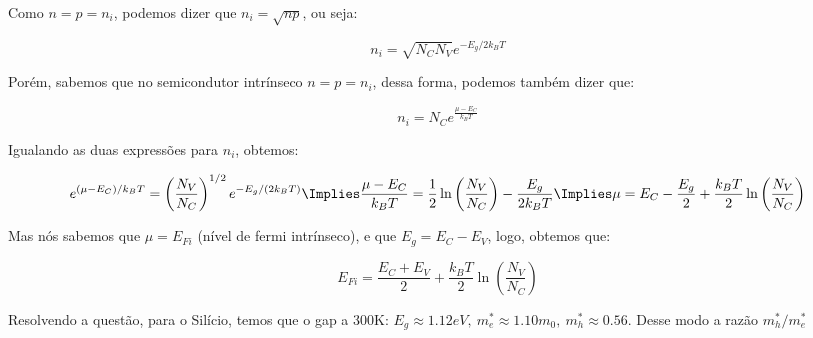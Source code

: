 \begin{enumerate}
Como $n = p = n_i$, podemos dizer que $n_i = \sqrt{np}$, ou seja:

$$n_i = \sqrt{N_CN_V}e^{-E_g/2k_BT}$$

Porém, sabemos que no semicondutor intrínseco $n = p = n_i$, dessa forma, podemos também dizer que:

$$n_i = N_C e^{\frac{\mu - E_C}{k_BT}}$$

Igualando as duas expressões para $n_i$, obtemos:

$$e^{(\mu - E_C)/k_BT} = \left(\frac{N_V}{N_C}\right)^{1/2}e^{-E_g/(2k_BT)}\\
\\
\Implies \frac{\mu - E_C}{k_BT} = \frac{1}{2}\ln{\left(\frac{N_V}{N_C}\right)} - \frac{E_g}{2k_BT}\\
\\
\Implies \mu = E_C - \frac{E_g}{2} + \frac{k_BT}{2}\ln{\left(\frac{N_V}{N_C}\right)}$$

Mas nós sabemos que $\mu = E_{Fi}$ (nível de fermi intrínseco), e que $E_g = E_C - E_V$, logo, obtemos que:

\begin{equation}
  E_{Fi} = \frac{E_C + E_V}{2} + \frac{k_BT}{2}\ln{\left(\frac{N_V}{N_C}\right)} 
\end{equation}

Resolvendo a questão, para o Silício, temos que o gap a 300K: $E_g \approx 1.12eV,\  m_e^*\approx 1.10m_0, \ m_h^* \approx 0.56$. Desse modo a razão $m_h^*/m_e^*$
\end{enumerate}
